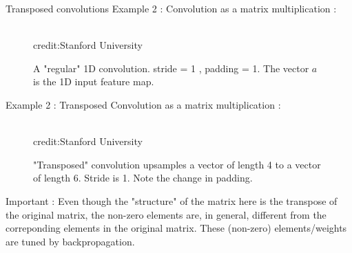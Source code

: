 \begin{vbframe}{Transposed convolutions}
\framebreak
Example 2 : Convolution as a matrix multiplication : 
\begin{figure}
\centering
{}
\tiny{\\credit:Stanford University}
\caption{A "regular" 1D convolution. stride = 1 , padding = 1. The vector $a$ is the 1D input feature map. }
\end{figure}
   
  
\framebreak
Example 2 : Transposed Convolution as a matrix multiplication :
\begin{figure}
\centering
{}
\tiny{\\credit:Stanford University}
\caption{"Transposed" convolution upsamples a vector of length 4 to a vector of length 6. Stride is 1. Note the change in padding.}
\end{figure}
\small{Important : Even though the "structure" of the matrix here is the transpose of the original matrix, the non-zero elements are, in general, different from the correponding elements in the original matrix. These (non-zero) elements/weights are tuned by backpropagation.} 


\end{vbframe}
